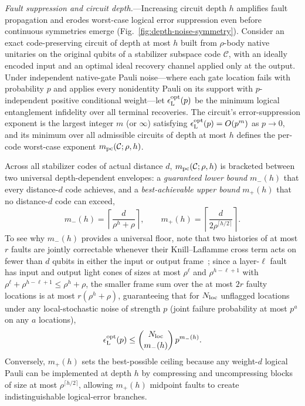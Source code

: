 \documentclass[aps,prl,reprint,notitlepage,nofootinbib,nobibnotes]{revtex4-2}
\begin{document}
\textit{Fault suppression and circuit depth.}---Increasing circuit depth \(h\) amplifies fault propagation and erodes worst-case logical error suppression even before continuous symmetries emerge (Fig.~\ref{fig:depth-noise-symmetry}). Consider an exact code-preserving circuit of depth at most \(h\) built from \(\rho\)-body native unitaries on the original qubits of a stabilizer subspace code \(\mathcal C\), with an ideally encoded input and an optimal ideal recovery channel applied only at the output. Under independent native-gate Pauli noise---where each gate location fails with probability \(p\) and applies every nonidentity Pauli on its support with \(p\)-independent positive conditional weight---let \(\epsilon_{\rm L}^{\rm opt}(p)\) be the minimum logical entanglement infidelity over all terminal recoveries. The circuit's error-suppression exponent is the largest integer \(m\) (or \(\infty\)) satisfying \(\epsilon_{\rm L}^{\rm opt}(p)=O(p^m)\) as \(p\to0\), and its minimum over all admissible circuits of depth at most \(h\) defines the per-code worst-case exponent \(m_{\rm pc}(\mathcal C;\rho,h)\).

Across all stabilizer codes of actual distance \(d\), \(m_{\rm pc}(\mathcal C;\rho,h)\) is bracketed between two universal depth-dependent envelopes: a \emph{guaranteed lower bound} \(m_-(h)\) that every distance-\(d\) code achieves, and a \emph{best-achievable upper bound} \(m_+(h)\) that no distance-\(d\) code can exceed,
\begin{equation}\label{eq:envelopes-def}
 m_-(h)=\left\lceil\frac{d}{\rho^h+\rho}\right\rceil,
 \qquad
 m_+(h)=\left\lceil\frac{d}{2\rho^{\lceil h/2\rceil}}\right\rceil .
\end{equation}
To see why \(m_-(h)\) provides a universal floor, note that two histories of at most \(r\) faults are jointly correctable whenever their Knill--Laflamme cross term acts on fewer than \(d\) qubits in either the input or output frame~\cite{KL}; since a layer-\(\ell\) fault has input and output light cones of sizes at most \(\rho^\ell\) and \(\rho^{h-\ell+1}\) with \(\rho^\ell+\rho^{h-\ell+1}\le\rho^h+\rho\), the smaller frame sum over the at most \(2r\) faulty locations is at most \(r(\rho^h+\rho)\), guaranteeing that for \(N_{\rm loc}\) unflagged locations under any local-stochastic noise of strength \(p\) (joint failure probability at most \(p^a\) on any \(a\) locations),
\begin{equation}\label{eq:discussion-noise-exponent}
 \epsilon_{\rm L}^{\rm opt}(p)
 \le \binom{N_{\rm loc}}{m_-(h)}\,p^{m_-(h)}.
\end{equation}
Conversely, \(m_+(h)\) sets the best-possible ceiling because any weight-\(d\) logical Pauli can be implemented at depth \(h\) by compressing and uncompressing blocks of size at most \(\rho^{\lceil h/2\rceil}\), allowing \(m_+(h)\) midpoint faults to create indistinguishable logical-error branches.
\end{document}
